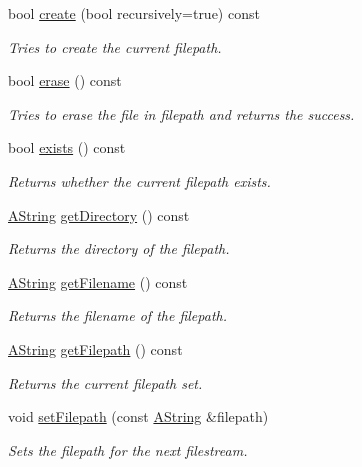 \begin{DoxyCompactItemize}
bool \mbox{\hyperlink{class_file_a208b0649e571a157d00dd91c6927d4be}{create}} (bool recursively=true) const
\begin{DoxyCompactList}\small\item\em Tries to create the current filepath. \end{DoxyCompactList}\item 
bool \mbox{\hyperlink{class_file_ad1eb2efb9d067dded30d4ef54eb307d1}{erase}} () const
\begin{DoxyCompactList}\small\item\em Tries to erase the file in filepath and returns the success. \end{DoxyCompactList}\item 
bool \mbox{\hyperlink{class_file_a53118ce36851cb1c6845a82f915fd8ba}{exists}} () const
\begin{DoxyCompactList}\small\item\em Returns whether the current filepath exists. \end{DoxyCompactList}\item 
\mbox{\hyperlink{class_a_string}{A\+String}} \mbox{\hyperlink{class_file_ac3770227bca4efa56a4d3a33fe83fa8e}{get\+Directory}} () const
\begin{DoxyCompactList}\small\item\em Returns the directory of the filepath. \end{DoxyCompactList}\item 
\mbox{\hyperlink{class_a_string}{A\+String}} \mbox{\hyperlink{class_file_a953668209fb0f4c62093ae2c31475902}{get\+Filename}} () const
\begin{DoxyCompactList}\small\item\em Returns the filename of the filepath. \end{DoxyCompactList}\item 
\mbox{\hyperlink{class_a_string}{A\+String}} \mbox{\hyperlink{class_file_a033178594e2a60e489d7ab2936676e90}{get\+Filepath}} () const
\begin{DoxyCompactList}\small\item\em Returns the current filepath set. \end{DoxyCompactList}\item 
void \mbox{\hyperlink{class_file_ae5b50c42cb117914a87347461b4bfb56}{set\+Filepath}} (const \mbox{\hyperlink{class_a_string}{A\+String}} \&filepath)
\begin{DoxyCompactList}\small\item\em Sets the filepath for the next filestream. \end{DoxyCompactList}\item 

\end{DoxyCompactItemize}
